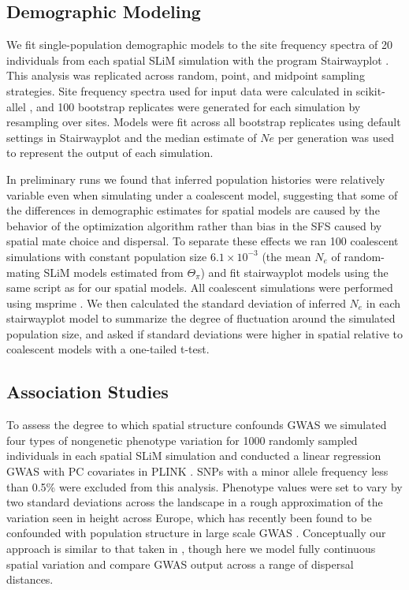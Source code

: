 \documentclass[11pt,twoside,lineno]{preprint}
\begin{document}
\subsection{Demographic Modeling}
We fit single-population demographic models to the site frequency spectra of 20 individuals from each spatial SLiM simulation with the program Stairwayplot \citep{Liu2015}. This analysis was replicated across random, point, and midpoint sampling strategies. Site frequency spectra used for input data were calculated in scikit-allel \citep{Miles2017}, and 100 bootstrap replicates were generated for each simulation by resampling over sites. Models were fit across all bootstrap replicates using default settings in Stairwayplot and the median estimate of $Ne$ per generation was used to represent the output of each simulation.

In preliminary runs we found that inferred population histories were relatively variable even when simulating under a coalescent model, suggesting that some of the differences in demographic estimates for spatial models are caused by the behavior of the optimization algorithm rather than bias in the SFS caused by spatial mate choice and dispersal. To separate these effects we ran 100 coalescent simulations with constant population size $6.1\times 10^{-3}$ (the mean $N_{e}$ of random-mating SLiM models estimated from $\Theta_{\pi}$) and fit stairwayplot models using the same script as for our spatial models. All coalescent simulations were performed using msprime \citep{Kelleher2016}. We then calculated the standard deviation of inferred $N_{e}$ in each stairwayplot model to summarize the degree of fluctuation around the simulated population size, and asked if standard deviations were higher in spatial relative to coalescent models with a one-tailed t-test.

\subsection{Association Studies}
To assess the degree to which spatial structure confounds GWAS we simulated four types of nongenetic phenotype variation for 1000 randomly sampled individuals in each spatial SLiM simulation and conducted a linear regression GWAS with PC covariates in PLINK \citep{PURCELL2007}. SNPs with a minor allele frequency less than 0.5\% were excluded from this analysis. Phenotype values were set to vary by two standard deviations across the landscape in a rough approximation of the variation seen in height across Europe, which has recently been found to be confounded with population structure in large scale GWAS \citep{Berg2018,Sohail2018}. Conceptually our approach is similar to that taken in \citep{Mathieson2012}, though here we model fully continuous spatial variation and compare GWAS output across a range of dispersal distances. 
\end{document}

